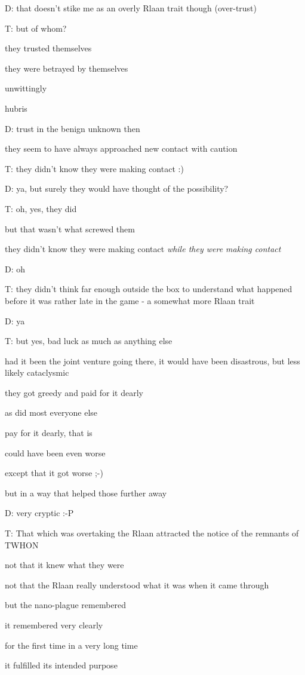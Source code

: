 {D: that doesn't stike me as an overly Rlaan trait though (over-trust)

T: but of whom?

they trusted themselves

they were betrayed by themselves

unwittingly

hubris

D: trust in the benign unknown then

they seem to have always approached new contact with caution

T: they didn't know they were making contact :)

D: ya, but surely they would have thought of the possibility?

T: oh, yes, they did

but that wasn't what screwed them

they didn't know they were making contact {\em while they were making contact}

D: oh

T: they didn't think far enough outside the box to understand what happened before it was rather late in the game - a somewhat more Rlaan trait

D: ya

T: but yes, bad luck as much as anything else

had it been the joint venture going there, it would have been disastrous, but less likely cataclysmic

they got greedy and paid for it dearly

as did most everyone else

pay for it dearly, that is

could have been even worse

except that it got worse ;-)

but in a way that helped those further away

D: very cryptic :-P

T: That which was overtaking the Rlaan attracted the notice of the remnants of TWHON

not that it knew what they were

not that the Rlaan really understood what it was when it came through

but the nano-plague remembered

it remembered very clearly

for the first time in a very long time

it fulfilled its intended purpose

}
